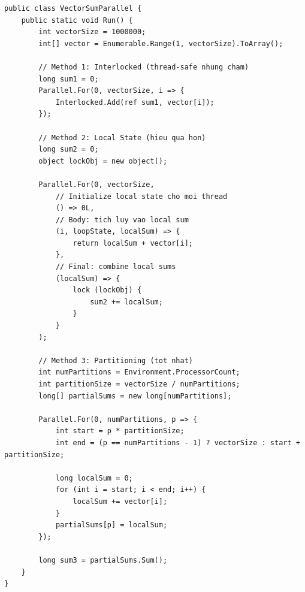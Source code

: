 \begin{lstlisting}[style=csharpstyle, caption={Vector Sum với Local State}, label={lst:vector_sum_parallel}]
public class VectorSumParallel {
    public static void Run() {
        int vectorSize = 1000000;
        int[] vector = Enumerable.Range(1, vectorSize).ToArray();
        
        // Method 1: Interlocked (thread-safe nhung cham)
        long sum1 = 0;
        Parallel.For(0, vectorSize, i => {
            Interlocked.Add(ref sum1, vector[i]);
        });
        
        // Method 2: Local State (hieu qua hon)
        long sum2 = 0;
        object lockObj = new object();
        
        Parallel.For(0, vectorSize,
            // Initialize local state cho moi thread
            () => 0L,
            // Body: tich luy vao local sum
            (i, loopState, localSum) => {
                return localSum + vector[i];
            },
            // Final: combine local sums
            (localSum) => {
                lock (lockObj) {
                    sum2 += localSum;
                }
            }
        );
        
        // Method 3: Partitioning (tot nhat)
        int numPartitions = Environment.ProcessorCount;
        int partitionSize = vectorSize / numPartitions;
        long[] partialSums = new long[numPartitions];
        
        Parallel.For(0, numPartitions, p => {
            int start = p * partitionSize;
            int end = (p == numPartitions - 1) ? vectorSize : start + partitionSize;
            
            long localSum = 0;
            for (int i = start; i < end; i++) {
                localSum += vector[i];
            }
            partialSums[p] = localSum;
        });
        
        long sum3 = partialSums.Sum();
    }
}
\end{lstlisting}

